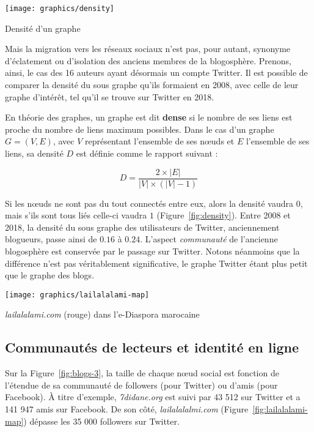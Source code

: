 \documentclass[symmetric,justified,marginals=raggedouter]{tufte-book}
\begin{document}
\begin{marginfigure}%
  \texttt{[image: graphics/density]}
  \vspace*{0.2cm}  
  \caption{Densité d'un graphe}
  \label{fig:density}
\end{marginfigure}

Mais la migration vers les réseaux sociaux n'est pas, pour autant, synonyme d'éclatement ou d'isolation des anciens membres de la blogosphère. Prenons, ainsi, le cas des 16 auteurs ayant désormais un compte Twitter. Il est possible de comparer la densité du sous graphe qu'ils formaient en 2008, avec celle de leur graphe d'intérêt, tel qu'il se trouve sur Twitter en 2018. 

En théorie des graphes, un graphe est dit \textbf{dense} si le nombre de ses liens est proche du nombre de liens maximum possibles. Dans le cas d'un graphe $G=(V,E)$, avec $V$ représentant l'ensemble de ses nœuds et $E$ l'ensemble de ses liens, sa densité $D$ est définie comme le rapport suivant :

\[
	D = \frac{2 \times |E|}{|V| \times (|V| - 1)}
\]

\noindent Si les nœuds ne sont pas du tout connectés entre eux, alors la densité vaudra $0$, mais s'ils sont tous liés celle-ci vaudra $1$ (Figure~\ref{fig:density}). Entre 2008 et 2018, la densité du sous graphe des utilisateurs de Twitter, anciennement blogueurs, passe ainsi de $0.16$ à $0.24$. L'aspect \textit{communauté} de l'ancienne blogosphère est conservée par le passage sur Twitter. Notons néanmoins que la différence n'est pas véritablement significative, le graphe Twitter étant plus petit que le graphe des blogs. 

\begin{marginfigure}%
  \texttt{[image: graphics/lailalalami-map]}
  \vspace*{0.2cm}  
  \caption{\textit{lailalalami.com} (rouge) dans l'e-Diaspora marocaine}
  \label{fig:lailalalami-map}
\end{marginfigure} 

\subsection{Communautés de lecteurs et identité en ligne}

\noindent Sur la Figure~\ref{fig:blogs-3}, la taille de chaque nœud social est fonction de l'étendue de sa communauté de followers (pour Twitter) ou d'amis (pour Facebook). À titre d'exemple, \textit{7didane.org} est suivi par 43 512 sur Twitter et a 141 947 amis sur Facebook. De son côté, \textit{lailalalalmi.com} (Figure~\ref{fig:lailalalami-map}) dépasse les 35 000 followers sur Twitter.
\end{document}
